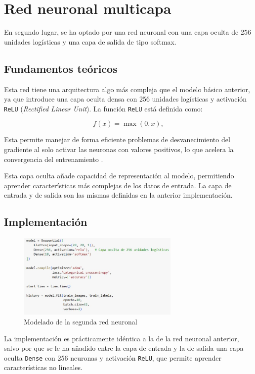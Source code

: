 \section{Red neuronal multicapa}

En segundo lugar, se ha optado por una red neuronal con una capa oculta de 256 unidades logísticas y una capa de salida de tipo softmax.

\subsection{Fundamentos teóricos}

Esta red tiene una arquitectura algo más compleja que el modelo básico anterior, ya que introduce una capa oculta densa con 256 unidades logísticas y activación \texttt{ReLU} (\textit{Rectified Linear Unit}). La función \texttt{ReLU} está definida como:

\[
f(x) = \max(0, x),
\]

Esta permite manejar de forma eficiente problemas de desvanecimiento del gradiente al solo activar las neuronas con valores positivos, lo que acelera la convergencia del entrenamiento \parencite{nair2010relu}.

Esta capa oculta añade capacidad de representación al modelo, permitiendo aprender características más complejas de los datos de entrada. La capa de entrada y de salida son las mismas definidas en la anterior implementación.


\subsection{Implementación}

\begin{figure}[H]
	\centering
	\includegraphics[width=0.7\textwidth]{imgs/model-red2.JPG}
	\caption{Modelado de la segunda red neuronal}
	\label{fig:model-red2}
\end{figure}

La implementación es prácticamente idéntica a la de la red neuronal anterior, salvo por que se le ha añadido entre la capa de entrada y la de salida una capa oculta \texttt{Dense} con 256 neuronas y activación \texttt{ReLU}, que permite aprender características no lineales.

